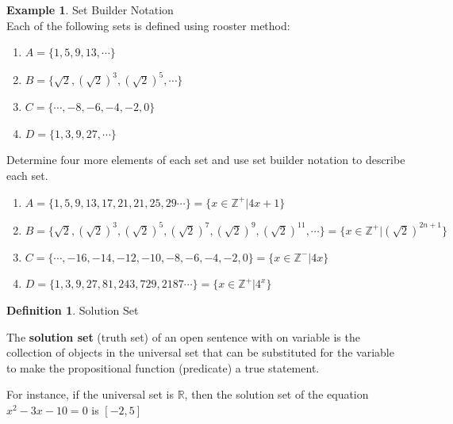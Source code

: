 \documentclass{book}
\theoremstyle{definition}
\newtheorem{definition}{Definition}[section]
\newtheorem{example}{Example}[definition]
\theoremstyle{remark}
\newcommand{\bb}[1]{\mathbb{#1}}
\begin{document}
\begin{example}
Set Builder Notation \cite[Chap.2, P.C.2.15]{ted} \\

Each of the following sets is defined using rooster method: \\
    
    \begin{enumerate}
        \item $A = \{1, 5, 9, 13, \cdots \}$
        \item $B = \{\sqrt{2},(\sqrt{2})^3, (\sqrt{2})^5, \cdots \}$
        \item $C = \{\cdots, -8, -6, -4, -2, 0 \}$ 
        \item $D = \{1, 3, 9, 27,  \cdots \}$
    \end{enumerate}
    
    
    Determine four more elements of each set and use set builder notation to describe each set. \\
    \begin{enumerate}
        \item $A = \{1, 5, 9, 13,17, 21, 21, 25, 29 \cdots \} = \{ x \in \mathbb{Z^+}| 4x + 1\}$ 
        \item $B = \{\sqrt{2},(\sqrt{2})^3, (\sqrt{2})^5, (\sqrt{2})^7, (\sqrt{2})^9, (\sqrt{2})^11, \cdots  \} = \{ x \in \mathbb{Z^+}|  (\sqrt{2})^{2n + 1} \}$ 
        \item $C = \{\cdots, -16, -14, -12, -10, -8, -6, -4, -2, 0 \} = \{ x \in \mathbb{Z^-}| 4x \}$ 
        \item $D = \{1, 3, 9, 27, 81, 243, 729, 2187  \cdots \} = \{ x \in \mathbb{Z^+}| 4^x \}$ 
    \end{enumerate}
\end{example}



\begin{definition}
Solution Set \\

    \begin{tcolorbox}
        The {\bf solution set} (truth set) of an open sentence with on variable is the collection of objects in the universal set that can be substituted for the variable to make the propositional function (predicate) a true statement. 
    \end{tcolorbox}
    
    For instance, if the universal set is $\bb{R}$, then the solution set of the equation $x^2 - 3x - 10 = 0$ is $[-2, 5]$ 
\end{definition}
    
\end{document}
